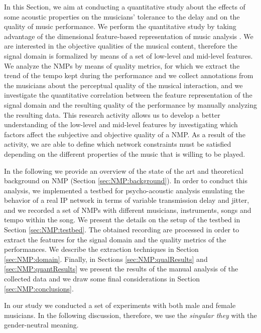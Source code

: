In this Section, we aim at conducting a quantitative study about the effects of some acoustic properties on the musicians' tolerance to the delay and on the quality of music performance. We perform the quantitative study by taking advantage of the dimensional feature-based representation of music analysis \cite{Kim2005,Zanoni2012}. We are interested in the objective qualities of the musical content, therefore the signal domain is formalized by means of a set of low-level and mid-level features. We analyze the NMPs by means of quality metrics, for which we extract the trend of the tempo kept during the performance and we collect annotations from the musicians about the perceptual quality of the musical interaction, and we investigate the quantitative correlation between the feature representation of the signal domain and the resulting quality of the performance by manually analyzing the resulting data. This research activity allows us to develop a better understanding of the low-level and mid-level features by investigating which factors affect the subjective and objective quality of a NMP. As a result of the activity, we are able to define which network constraints must be satisfied depending on the different properties of the music that is willing to be played.

In the following we provide an overview of the state of the art and theoretical background on NMP (Section \ref{sec:NMP:background}). In order to conduct this analysis, we implemented a testbed for psycho-acoustic analysis emulating the behavior of a real IP network in terms of variable transmission delay and jitter, and we recorded a set of NMPs with different musicians, instruments, songs and tempo within the song. We present the details on the setup of the testbed in Section \ref{sec:NMP:testbed}. The obtained recording are processed in order to extract the features for the signal domain and the quality metrics of the performances. We describe the extraction techniques in Section 
\ref{sec:NMP:domain}. Finally, in Sections \ref{sec:NMP:qualResults} and \ref{sec:NMP:quantResults} we present the results of the manual analysis of the collected data and we draw some final considerations in Section \ref{sec:NMP:conclusions}.

In our study we conducted a set of experiments with both male and female musicians. In the following discussion, therefore, we use the \textit{singular they} with the gender-neutral meaning. 



